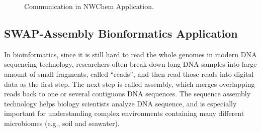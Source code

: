 \begin{figure}[h]
\centering
{}
\caption{Communication in NWChem Application.}
\label{fig:app-nwchem}
\end{figure}


\subsection{SWAP-Assembly Bionformatics Application}

In bioinformatics, since it is still hard to read the whole genomes
in modern DNA sequencing technology, researchers often break down long
DNA samples into large amount of small fragments, called ``reads'', and
then read those reads into digital data as the first step. The next step
is called assembly, which merges overlapping reads back to one or several contiguous DNA sequences. The sequence assembly technology helps biology
scientists analyze DNA sequence, and is especially important for understanding complex environments containing many different microbiomes
(e.g., soil and seawater).

